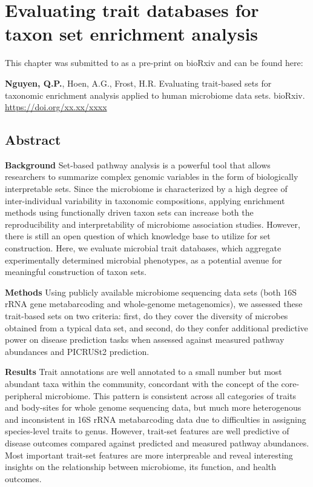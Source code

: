 \chapter{Evaluating trait databases for taxon set enrichment analysis}

This chapter was submitted to as a pre-print on bioRxiv and can be found here: 
\begin{center}
\justifying
\noindent \textbf{Nguyen, Q.P.}, Hoen, A.G., Frost, H.R. Evaluating trait-based sets for taxonomic enrichment analysis applied to human microbiome data sets. bioRxiv. \url{https://doi.org/xx.xx/xxxx}
\end{center}

\section{Abstract}
\textbf{Background} Set-based pathway analysis is a powerful tool that allows researchers to summarize complex genomic variables in the form of biologically interpretable sets. Since the microbiome is characterized by a high degree of inter-individual variability in taxonomic compositions, applying enrichment methods using functionally driven taxon sets can increase both the reproducibility and interpretability of microbiome association studies. However, there is still an open question of which knowledge base to utilize for set construction. Here, we evaluate microbial trait databases, which aggregate experimentally determined microbial phenotypes, as a potential avenue for meaningful construction of taxon sets.  

\noindent\textbf{Methods} Using publicly available microbiome sequencing data sets (both 16S rRNA gene metabarcoding and whole-genome metagenomics), we assessed these trait-based sets on two criteria: first, do they cover the diversity of microbes obtained from a typical data set, and second, do they confer additional predictive power on disease prediction tasks when assessed against measured pathway abundances and PICRUSt2 prediction.   

\noindent \textbf{Results} Trait annotations are well annotated to a small number but most abundant taxa within the community, concordant with the concept of the core-peripheral microbiome. This pattern is consistent across all categories of traits and body-sites for whole genome sequencing data, but much more heterogenous and inconsistent in 16S rRNA metabarcoding data due to difficulties in assigning species-level traits to genus. However, trait-set features are well predictive of disease outcomes compared against predicted and measured pathway abundances. Most important trait-set features are more interpreable and reveal interesting insights on the relationship between microbiome, its function, and health outcomes. 


